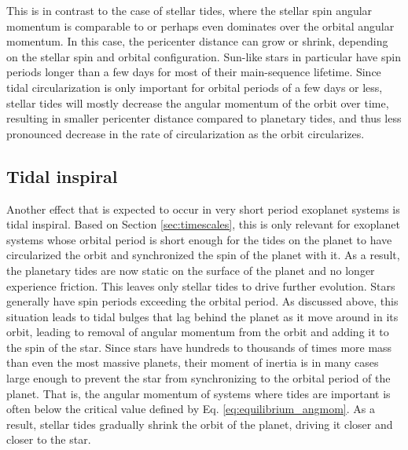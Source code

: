 This is in contrast to the case of stellar tides, where the stellar spin angular
momentum is comparable to or perhaps even dominates over the orbital angular
momentum. In this case, the pericenter distance can grow or shrink, depending on
the stellar spin and orbital configuration. Sun-like stars in particular have
spin periods longer than a few days for most of their main-sequence lifetime.
Since tidal circularization is only important for orbital periods of a few days
or less, stellar tides will mostly decrease the angular momentum of the orbit
over time, resulting in smaller pericenter distance compared to planetary
tides, and thus less pronounced decrease in the rate of circularization as the
orbit circularizes.

\subsection{Tidal inspiral}

Another effect that is expected to occur in very short period exoplanet systems
is tidal inspiral. Based on Section \ref{sec:timescales}, this is only relevant
for exoplanet systems whose orbital period is short enough for the tides on the
planet to have circularized the orbit and synchronized the spin of the planet
with it. As a result, the planetary tides are now static on the surface of the
planet and no longer experience friction. This leaves only stellar tides to
drive further evolution.  Stars generally have spin periods exceeding the
orbital period. As discussed above, this situation leads to tidal bulges that
lag behind the planet as it move around in its orbit, leading to removal of
angular momentum from the orbit and adding it to the spin of the star. Since
stars have hundreds to thousands of times more mass than even the most massive
planets, their moment of inertia is in many cases large enough to prevent the
star from synchronizing to the orbital period of the planet. That is, the
angular momentum of systems where tides are important is often below the
critical value defined by Eq.  \ref{eq:equilibrium_angmom}. As a result, stellar
tides gradually shrink the orbit of the planet, driving it closer and closer to
the star.

